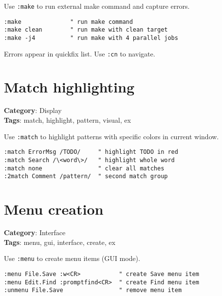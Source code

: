 {{{{{{Use {\footnotesize \Verb§:make§} to run external make command and capture errors.

\begin{Exa*}{}
\begin{Verbatim}[fontsize=\footnotesize, breaklines, breakanywhere]
:make              " run make command
:make clean        " run make with clean target
:make -j4          " run make with 4 parallel jobs
\end{Verbatim}
\end{Exa*}

Errors appear in quickfix list. Use {\footnotesize \Verb§:cn§} to navigate.

\section{Match highlighting}

\textbf{Category}: Display\\ \textbf{Tags}: match, highlight, pattern, visual, ex
\vspace{0.5cm}

Use {\footnotesize \Verb§:match§} to highlight patterns with specific colors in current window.

\begin{Exa*}{}
\begin{Verbatim}[fontsize=\footnotesize, breaklines, breakanywhere]
:match ErrorMsg /TODO/     " highlight TODO in red
:match Search /\<word\>/   " highlight whole word
:match none                " clear all matches
:2match Comment /pattern/  " second match group
\end{Verbatim}
\end{Exa*}

\section{Menu creation}

\textbf{Category}: Interface\\ \textbf{Tags}: menu, gui, interface, create, ex
\vspace{0.5cm}

Use {\footnotesize \Verb§:menu§} to create menu items (GUI mode).

\begin{Exa*}{}
\begin{Verbatim}[fontsize=\footnotesize, breaklines, breakanywhere]
:menu File.Save :w<CR>           " create Save menu item
:menu Edit.Find :promptfind<CR>  " create Find menu item
:unmenu File.Save                " remove menu item
\end{Verbatim}
\end{Exa*}

}}}}}}
